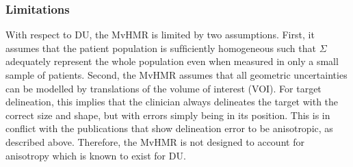 \documentclass[11pt]{article}
\begin{document}
\subsubsection{Limitations}

With respect to DU, the MvHMR is limited by two assumptions. First, it assumes that the patient population is sufﬁciently homogeneous such that $\Sigma$ adequately represent the whole population even when measured in only a small sample of patients.
Second, the MvHMR assumes that all geometric uncertainties can be modelled by translations of the volume of interest (VOI). For target delineation, this implies that the clinician always delineates the target with the correct size and shape, but with errors simply being in its position. This is in conﬂict with the publications that show delineation error to be anisotropic, as described above. Therefore, the MvHMR is not designed to account for anisotropy which is known to exist for DU.

\printbibliography
\end{document}
